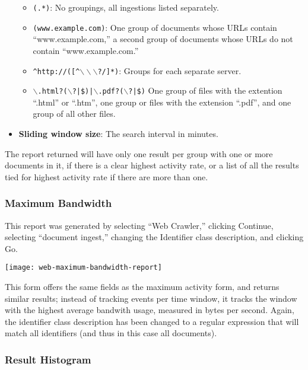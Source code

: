 \begin{changemargin}{1.5in}{0in}
\begin{itemize}
\begin{itemize}

\item \texttt{(.*)}: No groupings, all ingestions listed separately.

\item \texttt{(www.example.com)}: One group of documents whose URLs contain ``www.example.com,'' a second group of documents whose URLs do not contain ``www.example.com.''

\item \texttt{\^{}http://([\^{}$\backslash\backslash\backslash$?/]*)}:
Groups for each separate server.

\item
\texttt{$\backslash$.html?($\backslash$?|\$)|$\backslash$.pdf?($\backslash$?|\$)}
One group of files with the extention ``.html'' or ``.htm'', one group
or files with the extension ``.pdf'', and one group of all other
files.


\end{itemize}

\item \textbf{Sliding window size}: The search interval in minutes.

\end{itemize}

The report returned will have only one result per group with one or more
documents in it, if there is a clear highest activity rate, or a list of
all the results tied for highest activity rate if there are more than one.

\subsubsection{Maximum Bandwidth}

This report was generated by selecting ``Web Crawler,''
clicking Continue, selecting ``document ingest,'' changing the Identifier
class description, and clicking Go.

\texttt{[image: web-maximum-bandwidth-report]}

This form offers the same fields as the maximum activity form, and
returns similar results; instead of tracking events per time window,
it tracks the window with the highest average bandwith usage, measured
in bytes per second. Again, the identifier class description has been
changed to a regular expression that will match all identifiers (and
thus in this case all documents).

\subsubsection{Result Histogram}


\end{changemargin}
